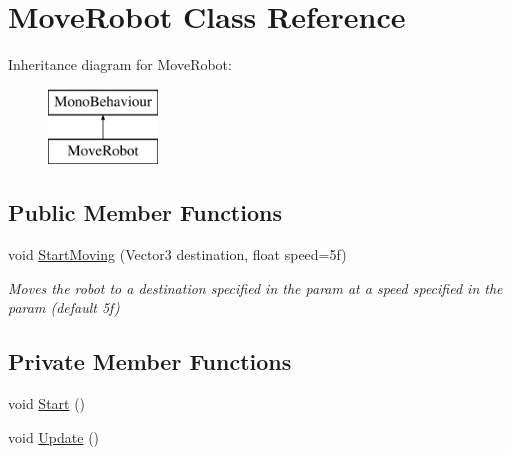 \hypertarget{class_move_robot}{}\section{Move\+Robot Class Reference}
\label{class_move_robot}
Inheritance diagram for Move\+Robot\+:\begin{figure}[H]
\begin{center}
\leavevmode
\includegraphics[height=2.000000cm]{class_move_robot}
\end{center}
\end{figure}
\subsection*{Public Member Functions}
\begin{DoxyCompactItemize}
\item 
void \mbox{\hyperlink{class_move_robot_acaa18eb45c2af4e040d08314ef6bfd77}{Start\+Moving}} (Vector3 destination, float speed=5f)
\begin{DoxyCompactList}\small\item\em Moves the robot to a destination specified in the param at a speed specified in the param (default 5f) \end{DoxyCompactList}\end{DoxyCompactItemize}
\subsection*{Private Member Functions}
\begin{DoxyCompactItemize}
\item 
void \mbox{\hyperlink{class_move_robot_a6f4c86e1a93a5f83cdde0d43998d48bd}{Start}} ()
\item 
void \mbox{\hyperlink{class_move_robot_a358d1401815e59ddae6edca2f7874b88}{Update}} ()
\end{DoxyCompactItemize}
